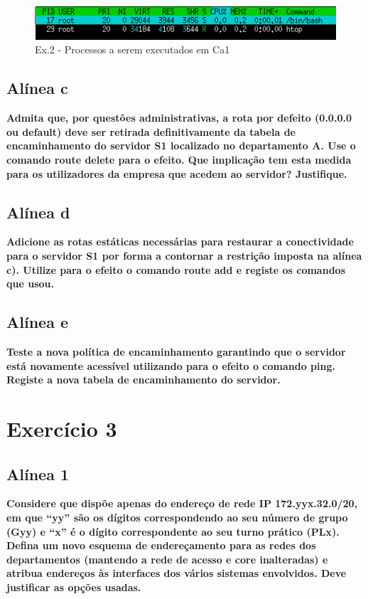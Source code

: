 \documentclass[a4paper]{report}
\begin{document}
\begin{figure}[H]
    \centering 
    \includegraphics[width=\textwidth]{images/htopca1.png}
    \caption{Ex.2 - Processos a serem executados em Ca1}
    \label{fig:htopca1}
\end{figure}

\subsection{Alínea c}
\textbf{Admita que, por questões administrativas, a rota por defeito (0.0.0.0 ou 
default) deve ser retirada definitivamente da tabela de encaminhamento do 
servidor S1 localizado no departamento A. Use o comando route delete para o 
efeito. Que implicação tem esta medida para os utilizadores da empresa que 
acedem ao servidor? Justifique.}

\subsection{Alínea d}
\textbf{Adicione as rotas estáticas necessárias para restaurar a conectividade
para o servidor S1 por forma a contornar a restrição imposta na alínea c). Utilize
para o efeito o comando route add e registe os comandos que usou.}

\subsection{Alínea e}
\textbf{Teste a nova política de encaminhamento garantindo que o servidor está novamente
acessível utilizando para o efeito o comando ping. Registe a nova tabela de
encaminhamento do servidor.}

\section{Exercício 3}

\subsection{Alínea 1}
\textbf{Considere que dispõe apenas do endereço de rede IP 172.yyx.32.0/20, em que “yy”
são os dígitos correspondendo ao seu número de grupo (Gyy) e “x” é o dígito 
correspondente ao seu turno prático (PLx). Defina um novo esquema de endereçamento para 
as redes dos departamentos (mantendo a rede de acesso e core inalteradas) e atribua 
endereços às interfaces dos vários sistemas envolvidos. Deve justificar as opções usadas.}
\end{document}
